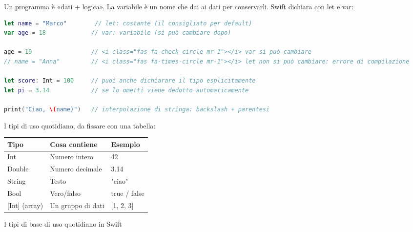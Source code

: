 


Un programma è «dati + logica». La variabile è un nome che dai ai dati per conservarli. Swift dichiara con let e var:

\begin{lstlisting}[language=Swift]
let name = "Marco"        // let: costante (il consigliato per default)
var age = 18             // var: variabile (si può cambiare dopo)

age = 19                 // <i class="fas fa-check-circle mr-1"></i> var si può cambiare
// name = "Anna"         // <i class="fas fa-times-circle mr-1"></i> let non si può cambiare: errore di compilazione

let score: Int = 100     // puoi anche dichiarare il tipo esplicitamente
let pi = 3.14            // se lo ometti viene dedotto automaticamente

print("Ciao, \(name)")   // interpolazione di stringa: backslash + parentesi
\end{lstlisting}

I tipi di uso quotidiano, da fissare con una tabella:

\begin{center}
\begin{tabularx}{\linewidth}{|X|X|X|}
\hline
\textbf{Tipo} & \textbf{Cosa contiene} & \textbf{Esempio} \tabularnewline
\hline
Int & Numero intero & 42 \tabularnewline
Double & Numero decimale & 3.14 \tabularnewline
String & Testo & "ciao" \tabularnewline
Bool & Vero/falso & true / false \tabularnewline
{}[Int] (array) & Un gruppo di dati & {}[1, 2, 3] \tabularnewline
\hline
\end{tabularx}
\end{center}

\begin{center}\small\color{gray}I tipi di base di uso quotidiano in Swift\end{center}

